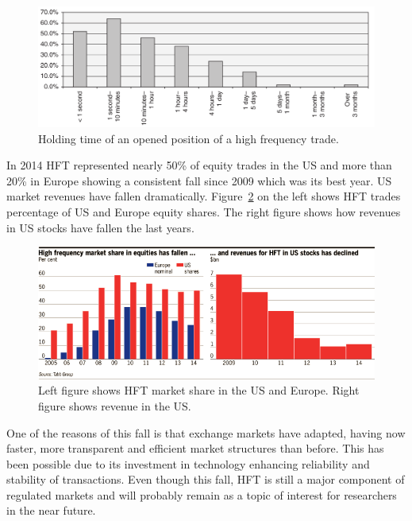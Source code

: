\begin{figure}[!h]
  \centering
  \includegraphics[width=\textwidth]{img/HFTtradestime}
  \caption{Holding time of an opened position of a high frequency trade.}
  \label{fig:HFTtimes}
\end{figure}
In 2014 HFT represented nearly 50\% of equity trades in the US and more than 20\%
in Europe showing a consistent fall since 2009 which was its best year. US market revenues
have fallen dramatically.
Figure~\ref{fig:HFTmarket} on the left shows HFT trades percentage of US and Europe equity shares. The right figure shows how revenues in US stocks have fallen the last years.

\begin{figure}[!h]
  \centering
  \includegraphics[width=\textwidth]{img/HFTmarket}
  \caption{Left figure shows HFT market share in the US and Europe. Right figure
  shows revenue in the US.}
  \label{fig:HFTmarket}
\end{figure}
One of the reasons of this fall is that exchange markets have adapted, having
now faster, more transparent and efficient market structures than before.
This has been possible due to its investment in technology enhancing
reliability and stability of transactions. Even though this fall, HFT is still a major component of regulated markets and
will probably remain as a topic of interest for researchers in the near future.

